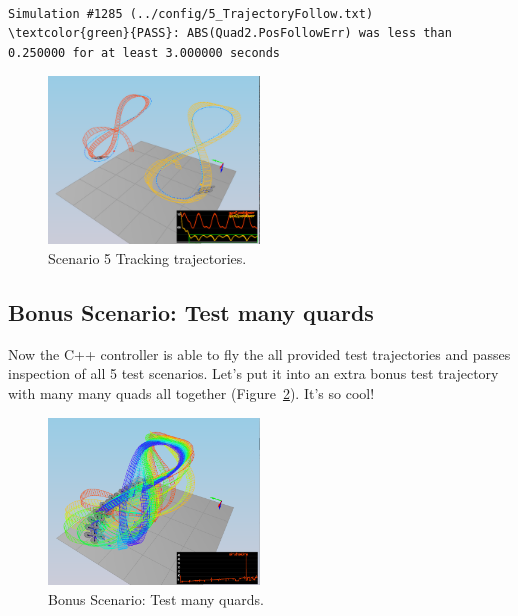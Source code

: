 \documentclass[letterpaper]{article}
\begin{document}
\begin{Verbatim}[frame=lines, label=Simulator Test Result Output, commandchars=\\\{\}]

Simulation #1285 (../config/5_TrajectoryFollow.txt)
\textcolor{green}{PASS}: ABS(Quad2.PosFollowErr) was less than 0.250000 for at least 3.000000 seconds
\end{Verbatim}

\begin{figure}[ht]
\centering
\includegraphics[width=0.5\textwidth]{./fig/scenario5.png}
\caption{\label{fig:scenario5} Scenario 5 Tracking trajectories.}
\end{figure}

\subsection{Bonus Scenario: Test many quards}

Now the C++ controller is able to fly the all provided test trajectories and passes inspection of all 5 test scenarios. Let's put it into an extra bonus test trajectory with many many quads all together (Figure~\ref{fig:scenario_test1}). It's so cool! 

\begin{figure}[ht]
\centering
\includegraphics[width=0.5\textwidth]{./fig/scenario_test1.png}
\caption{\label{fig:scenario_test1} Bonus Scenario: Test many quards.}
\end{figure}
\end{document}

